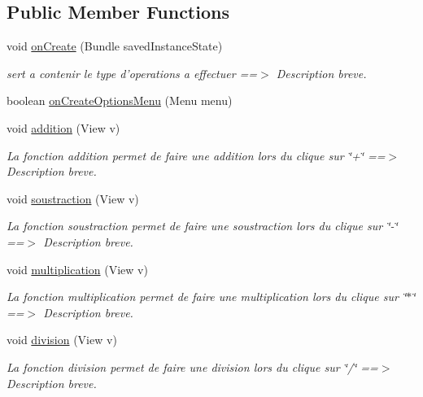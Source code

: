 \subsection*{Public Member Functions}
\begin{DoxyCompactItemize}
\item 
void \hyperlink{classcom_1_1example_1_1calculatrice_1_1_calculatrice_a522787a430f3b8375904dab26c4ab221}{on\-Create} (Bundle saved\-Instance\-State)
\begin{DoxyCompactList}\small\item\em sert a contenir le type d'operations a effectuer ==$>$ Description breve. \end{DoxyCompactList}\item 
boolean \hyperlink{classcom_1_1example_1_1calculatrice_1_1_calculatrice_a7f4f3e3f874d743a3e103d3798b60626}{on\-Create\-Options\-Menu} (Menu menu)
\item 
void \hyperlink{classcom_1_1example_1_1calculatrice_1_1_calculatrice_a451f694a60dcdddcfe450ad1abee159b}{addition} (View v)
\begin{DoxyCompactList}\small\item\em La fonction addition permet de faire une addition lors du clique sur \char`\"{}+\char`\"{} ==$>$ Description breve. \end{DoxyCompactList}\item 
void \hyperlink{classcom_1_1example_1_1calculatrice_1_1_calculatrice_a8e3dde2e6f1f65eaea278786e9b2a06d}{soustraction} (View v)
\begin{DoxyCompactList}\small\item\em La fonction soustraction permet de faire une soustraction lors du clique sur \char`\"{}-\/\char`\"{} ==$>$ Description breve. \end{DoxyCompactList}\item 
void \hyperlink{classcom_1_1example_1_1calculatrice_1_1_calculatrice_ae48705eb7153e48a9eada2a7c0c012fe}{multiplication} (View v)
\begin{DoxyCompactList}\small\item\em La fonction multiplication permet de faire une multiplication lors du clique sur \char`\"{}$\ast$\char`\"{} ==$>$ Description breve. \end{DoxyCompactList}\item 
void \hyperlink{classcom_1_1example_1_1calculatrice_1_1_calculatrice_a653a4d58c9076b6bdeb360a2d32042f3}{division} (View v)
\begin{DoxyCompactList}\small\item\em La fonction division permet de faire une division lors du clique sur \char`\"{}/\char`\"{} ==$>$ Description breve. \end{DoxyCompactList}\item 

\end{DoxyCompactItemize}
